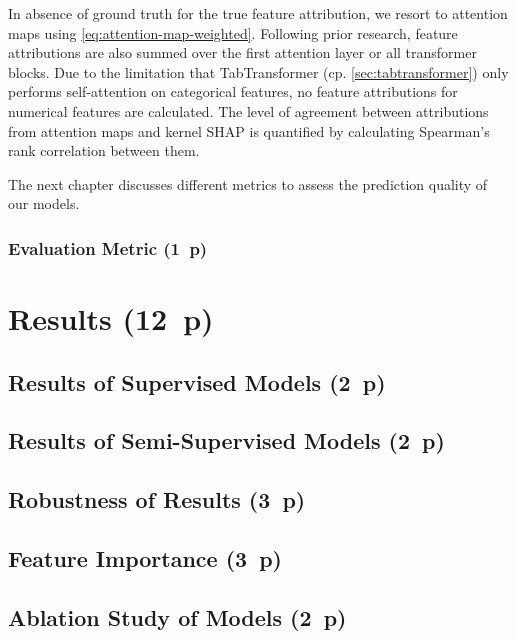 In absence of ground truth for the true feature attribution, we resort to attention maps using \cref{eq:attention-map-weighted}. Following prior research, feature attributions are also summed over the first attention layer or all transformer blocks. Due to the limitation that TabTransformer (cp. \cref{sec:tabtransformer}) only performs self-attention on categorical features, no feature attributions for numerical features are calculated. The level of agreement between attributions from attention maps and kernel \gls{SHAP} is quantified by calculating Spearman's rank correlation between them.

The next chapter discusses different metrics to assess the prediction quality of our models.

\subsubsection{Evaluation Metric (1~p)}\label{sec:evaluation-metric}

\newpage
\section{Results (12~p)}\label{sec:results}

\subsection{Results of Supervised
Models (2~p)}\label{sec:results-of-supervised-models}

\subsection{Results of Semi-Supervised
Models (2~p)}\label{sec:results-of-semi-supervised-models}

\subsection{Robustness of Results (3~p)}\label{sec:robustness-checks}

\subsection{Feature Importance (3~p)}\label{sec:feature-importance}

\subsection{Ablation Study of Models (2~p)}\label{sec:ablation-study}

